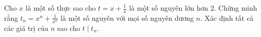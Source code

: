 \ifshowproblem
\begin{problem}\label{example:GBR-2015-MO1-P4}
    Cho \( x \) là một số thực sao cho \( t = x + \frac{1}{x} \) là một số nguyên lớn hơn \( 2 \).  
    Chứng minh rằng \( t_n = x^n + \frac{1}{x^n} \) là một số nguyên với mọi số nguyên dương \( n \).  
    Xác định tất cả các giá trị của \( n \) sao cho \( t \mid t_n \).
\end{problem}
\fi

\fi